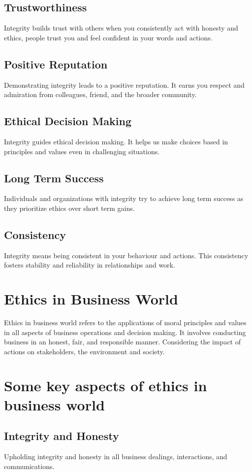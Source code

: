 \documentclass{report}
\begin{document}
\subsection*{Trustworthiness}
Integrity builds trust with others when you consistently act with honesty and ethics, people trust you and feel confident in your words and actions.
\subsection*{Positive Reputation}
Demonstrating integrity leads to a positive reputation. It earns you respect and admiration from colleagues, friend, and the broader community.
\subsection*{Ethical Decision Making}
Integrity guides ethical decision making. It helps us make choices based in principles and values even in challenging situations.
\subsection*{Long Term Success}
Individuals and organizations with integrity try to achieve long term success as they prioritize ethics over short term gains.
\subsection*{Consistency}
Integrity means being consistent in your behaviour and actions. This consistency fosters stability and reliability in relationships and work.
\section*{Ethics in Business World}
Ethics in business world refers to the applications of moral principles and values in all aspects of business operations and decision making. It involves conducting business in an honest, fair, and responsible manner. Considering the impact of actions on stakeholders, the environment and society.
\section*{Some key aspects of ethics in business world}
\subsection*{Integrity and Honesty}
Upholding integrity and honesty in all business dealings, interactions, and communications.
\end{document}
